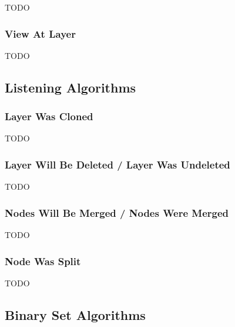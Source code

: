 TODO

\subsubsection{View At Layer}

TODO

\subsection{Listening Algorithms}

\subsubsection{Layer Was Cloned}

TODO

\subsubsection{Layer Will Be Deleted / Layer Was Undeleted}

TODO

\subsubsection{Nodes Will Be Merged / Nodes Were Merged}

TODO

\subsubsection{Node Was Split}

TODO

\subsection{Binary Set Algorithms}

